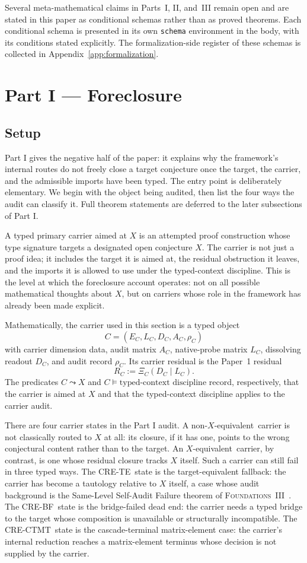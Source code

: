\documentclass[11pt]{article}
\newcommand{\FThree}{\textsc{Foundations~III}}
\newcommand{\Xequiv}{$X$-equivalent}
\newcommand{\nonXequiv}{non-$X$-equivalent}
\newcommand{\CRETE}{\textsc{CRE-TE}}
\newcommand{\CREBF}{\textsc{CRE-BF}}
\newcommand{\CRECTMT}{\textsc{CRE-CTMT}}
\newcommand{\TCD}{typed-context discipline}
\theoremstyle{definition}
\begin{document}
Several meta-mathematical claims in Parts~I, II, and~III remain open and
are stated in this paper as conditional schemas rather than as proved
theorems. Each conditional schema is presented in its own
\texttt{schema} environment in the body, with its conditions stated
explicitly. The formalization-side register of these schemas is
collected in Appendix~\ref{app:formalization}.
 \section{Part I --- Foreclosure}\label{sec:foreclosure}

\subsection{Setup}\label{sec:foreclosure:setup}

Part I gives the negative half of the paper: it explains why the
framework's internal routes do not freely close a target conjecture
once the target, the carrier, and the admissible imports have been
typed.  The entry point is deliberately elementary.  We begin with the
object being audited, then list the four ways the audit can classify
it.  Full theorem statements are deferred to the later subsections of
Part I.

A typed primary carrier aimed at \(X\) is an attempted proof
construction whose type signature targets a designated open conjecture
\(X\).  The carrier is not just a proof idea; it includes the target it
is aimed at, the residual obstruction it leaves, and the imports it is
allowed to use under the \TCD.  This is the level at which the
foreclosure account operates: not on all possible mathematical
thoughts about \(X\), but on carriers whose role in the framework has
already been made explicit.

Mathematically, the carrier used in this section is a typed object
\[
  C=(E_C,L_C,D_C,A_C,\rho_C)
\]
with carrier dimension data, audit matrix \(A_C\), native-probe matrix
\(L_C\), dissolving readout \(D_C\), and audit record \(\rho_C\).  Its
carrier residual is the Paper~1 residual
\[
  R_C := \Xi_C(D_C\mid L_C).
\]
The predicates \(C\leadsto X\) and \(C\models\text{\TCD}\) record,
respectively, that the carrier is aimed at \(X\) and that the
typed-context discipline applies to the carrier audit.

There are four carrier states in the Part I audit.  A \nonXequiv\
carrier is not classically routed to \(X\) at all: its closure, if it
has one, points to the wrong conjectural content rather than to the
target.  An \Xequiv\ carrier, by contrast, is one whose residual
closure tracks \(X\) itself.  Such a carrier can still fail in three
typed ways.  The \CRETE\ state is the target-equivalent fallback: the
carrier has become a tautology relative to \(X\) itself, a case whose
audit background is the Same-Level Self-Audit Failure theorem of
\FThree\ \cite{Tsiokos2026FoundationsIII}.  The \CREBF\ state is the
bridge-failed dead end: the carrier needs a typed bridge to the target
whose composition is unavailable or structurally incompatible.  The
\CRECTMT\ state is the cascade-terminal matrix-element case: the
carrier's internal reduction reaches a matrix-element terminus whose
decision is not supplied by the carrier.
\end{document}
